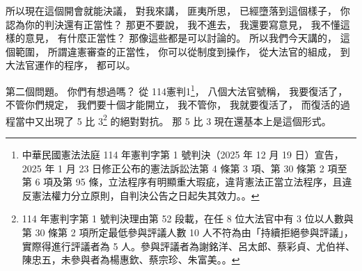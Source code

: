 \hypertarget{w01:cue:1149}{}所以現在這個開會就能決議，
\hypertarget{w01:cue:1150}{}對我來講，
\hypertarget{w01:cue:1151}{}匪夷所思，
\hypertarget{w01:cue:1152}{}已經墮落到這個樣子，
\hypertarget{w01:cue:1153}{}你認為你的判決還有正當性？
\hypertarget{w01:cue:1154}{}那更不要說，
\hypertarget{w01:cue:1155}{}我不進去，
\hypertarget{w01:cue:1156}{}我還要寫意見，
\hypertarget{w01:cue:1157}{}我不懂這樣的意見，
\hypertarget{w01:cue:1158}{}有什麼正當性？
\hypertarget{w01:cue:1159}{}那像這些都是可以討論的。
\hypertarget{w01:cue:1160}{}所以我們今天講的，
\hypertarget{w01:cue:1161}{}這個範圍，
\hypertarget{w01:cue:1162}{}所謂違憲審查的正當性，
\hypertarget{w01:cue:1163}{}你可以從制度到操作，
\hypertarget{w01:cue:1164}{}從大法官的組成，
\hypertarget{w01:cue:1165}{}到大法官運作的程序，
\hypertarget{w01:cue:1166}{}都可以。

\hypertarget{w01:cue:1167}{}第二個問題。
\hypertarget{w01:cue:1168}{}你們有想過嗎？
\hypertarget{w01:cue:1169}{}從 114憲判1\footnote{中華民國憲法法庭 114 年憲判字第 1 號判決（2025 年 12 月 19 日）宣告，2025 年 1 月 23 日修正公布的憲法訴訟法第 4 條第 3 項、第 30 條第 2 項至第 6 項及第 95 條，立法程序有明顯重大瑕疵，違背憲法正當立法程序，且違反憲法權力分立原則，自判決公告之日起失其效力。\cite{ccj114-1}。}，
\hypertarget{w01:cue:1170}{}八個大法官號稱，
\hypertarget{w01:cue:1171}{}我要復活了，
\hypertarget{w01:cue:1172}{}不管你們規定，
\hypertarget{w01:cue:1173}{}我們要十個才能開立，
\hypertarget{w01:cue:1174}{}我不管你，
\hypertarget{w01:cue:1175}{}我就要復活了，
\hypertarget{w01:cue:1176}{}而復活的過程當中又出現了 5 比 3\footnote{114 年憲判字第 1 號判決理由第 52 段載，在任 8 位大法官中有 3 位以人數與第 30 條第 2 項所定最低參與評議人數 10 人不符為由「持續拒絕參與評議」，實際得進行評議者為 5 人。參與評議者為謝銘洋、呂太郎、蔡彩貞、尤伯祥、陳忠五，未參與者為楊惠欽、蔡宗珍、朱富美。\cite[理由第 52 段]{ccj114-1}。} 的絕對對抗。
\hypertarget{w01:cue:1177}{}那 5 比 3 現在還基本上是這個形式。

